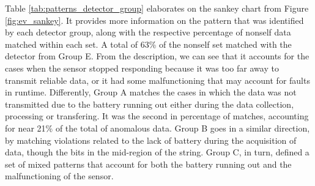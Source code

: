 Table \ref{tab:patterns_detector_group} elaborates on the sankey chart from Figure \ref{fig:ev_sankey}. It provides more information on the pattern that was identified by each detector group, along with the respective percentage of nonself data matched within each set. A total of 63\% of the nonself set matched with the detector from Group E. From the description, we can see that it accounts for the cases when the sensor stopped responding because it was too far away to transmit reliable data, or it had some malfunctioning that may account for faults in runtime. Differently, Group A matches the cases in which the data was not transmitted due to the battery running out either during the data collection, processing or transfering. It was the second in percentage of matches, accounting for near 21\% of the total of anomalous data. Group B goes in a similar direction, by matching violations related to the lack of battery during the acquisition of data, though the bits in the mid-region of the string. Group C, in turn, defined a set of mixed patterns that account for both the battery running out and the malfunctioning of the sensor.


